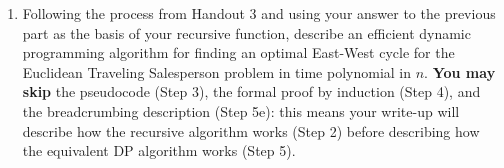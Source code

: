\documentclass[12 pt, letterpaper]{hmcpset}
\begin{document}
\begin{problem}
\begin{enumerate}
    Fix a pair of indices $i, j$. We can assume $i \leq j$ without loss of generality: this is because $\mathtt{minEWpath}(i, j)$ is the same as $\mathtt{minEWpath}(i, j)$, since we can just reverse the direction of travel. Suppose we have previously computed and stored the value of $\mathtt{minEWpath}(k, \ell)$ for every $k \geq i$, $\ell \geq j$ (except $(k, \ell) = (i, j)$). Explain how to compute $\mathtt{minEWpath}(i, j)$ using this information.

    \item Following the process from Handout 3 and using your answer to the previous part as the basis of your recursive function, describe an efficient dynamic programming algorithm for finding an optimal East-West cycle for the Euclidean Traveling Salesperson problem in time polynomial in $n$. \textbf{You may skip} the pseudocode (Step 3), the formal proof by induction (Step 4), and the breadcrumbing description (Step 5e): this means your write-up will describe how the recursive algorithm works (Step 2) before describing how the equivalent DP algorithm works (Step 5).
\end{enumerate}
\end{problem}
\end{document}
